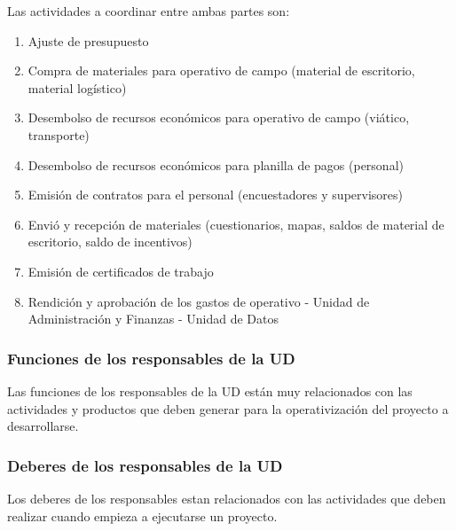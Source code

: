 \documentclass{article}
\begin{document}
Las actividades a coordinar entre ambas partes son:

\begin{enumerate}
\item Ajuste de presupuesto 
\item Compra de materiales para operativo de campo (material de escritorio, material logístico)
\item Desembolso de recursos económicos para operativo de campo (viático, transporte)
\item Desembolso de recursos económicos para planilla de pagos (personal)
\item Emisión de contratos para el personal (encuestadores y supervisores) 
\item Envió y recepción de materiales (cuestionarios, mapas, saldos de material de escritorio, saldo de incentivos)
\item Emisión de certificados de trabajo
\item Rendición y aprobación de los gastos de operativo - Unidad de Administración y Finanzas - Unidad de Datos
\end{enumerate}

\subsubsection{Funciones de los responsables de la UD}

Las funciones de los responsables de la UD están muy relacionados con las actividades y productos que deben generar para la operativización del proyecto a desarrollarse. 

\subsubsection{Deberes de los responsables de la UD}

Los deberes de los responsables estan relacionados con las actividades que deben realizar cuando empieza a ejecutarse un proyecto.
\end{document}
